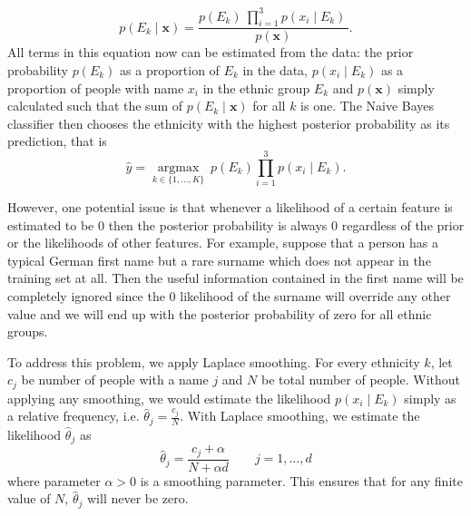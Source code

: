 \begin{equation}
p(E_k \mid \mathbf{x}) = \frac{p(E_k) \  \prod_{i=1}^3 p(x_i \mid E_k)\,}{p(\mathbf{x})}.
\end{equation}
 All terms in this equation now can be estimated from the data: the prior probability $p(E_k)$ as a proportion of $E_k$ in the data, $p(x_i \mid E_k)$ as a proportion of people with name $x_i$ in the ethnic group $E_k$ and $p(\mathbf{x})$ simply calculated such that the sum of $p(E_k \mid \mathbf{x})$ for all $k$ is one. 
The Naive Bayes classifier then chooses the ethnicity with the highest posterior probability as its prediction, that is
\begin{equation}
    \hat{y} = \underset{k \in \{1, \dots, K\}}{\operatorname{argmax}} \ p(E_k) \displaystyle\prod_{i=1}^{3} p(x_i \mid E_k).
\end{equation}

However, one potential issue is that whenever a likelihood of a certain feature is estimated to be 0 then the posterior probability is always 0 regardless of the prior  or the likelihoods of other features. For example, suppose that a person has a typical German first name but a rare surname which does not appear in the training set at all. 
Then the useful information contained in the first name will be completely ignored since the 0 likelihood of the surname will override any other value and we will end up with the posterior probability of zero for all ethnic groups.

To address this problem, we apply Laplace smoothing. 
For every ethnicity $k$, let $c_j$ be number of people with a name $j$ and $N$ be total number of people.  Without applying any smoothing, we would estimate the likelihood  $p(x_i \mid E_k)$ simply as a relative frequency, i.e. $\hat\theta_j = \frac{c_j}{N}$. With  Laplace smoothing, we estimate  the  likelihood $\hat\theta_j$ as 
\begin{equation}
    \hat\theta_j = \frac{c_j + \alpha}{N + \alpha d} \qquad j = 1, \dots, d
\end{equation}
where parameter $\alpha > 0 $ is a smoothing parameter.  This ensures that for any finite value of $N$,  $\hat\theta_j$ will never be zero. %




